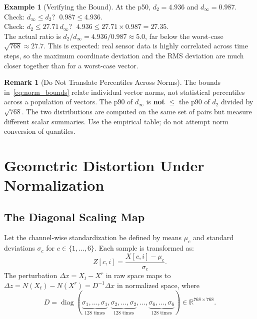 \documentclass[11pt, a4paper]{article}
\theoremstyle{definition}
\newtheorem{example}{Example}[section]
\newtheorem{remark}{Remark}[section]
\theoremstyle{plain}
\newcommand{\R}{\mathbb{R}}
\begin{document}
\begin{example}[Verifying the Bound]
  At the p50, $d_2 = 4.936$ and $d_\infty = 0.987$.
  Check: $d_\infty \le d_2$? $\;0.987 \le 4.936$. \checkmark \\
  Check: $d_2 \le 27.71 \, d_\infty$? $\;4.936 \le 27.71 \times 0.987 = 27.35$. \checkmark \\
  The actual ratio is $d_2 / d_\infty = 4.936 / 0.987 \approx 5.0$, far below
  the worst-case $\sqrt{768} \approx 27.7$. This is expected: real sensor data
  is highly correlated across time steps, so the maximum coordinate deviation
  and the RMS deviation are much closer together than for a worst-case vector.
\end{example}

\begin{remark}[Do Not Translate Percentiles Across Norms]
  The bounds in~\eqref{eq:norm_bounds} relate individual vector norms, not
  statistical percentiles across a population of vectors. The p90 of $d_\infty$
  is \textbf{not} $\le$ the p90 of $d_2$ divided by $\sqrt{768}$. The two
  distributions are computed on the same set of pairs but measure different
  scalar summaries. Use the empirical table; do not attempt norm conversion of
  quantiles.
\end{remark}

\section{Geometric Distortion Under Normalization}

\subsection{The Diagonal Scaling Map}

Let the channel-wise standardization be defined by means $\mu_c$ and standard
deviations $\sigma_c$ for $c \in \{1, \ldots, 6\}$. Each sample is transformed as:
\[
  Z[c, i] = \frac{X[c, i] - \mu_c}{\sigma_c}.
\]
The perturbation $\Delta x = X_t - X^r$ in raw space maps to
$\Delta z = N(X_t) - N(X^r) = D^{-1} \Delta x$ in normalized space, where
\[
  D = \operatorname{diag}(\underbrace{\sigma_1, \ldots, \sigma_1}_{128 \text{ times}},
                           \underbrace{\sigma_2, \ldots, \sigma_2}_{128 \text{ times}},
                           \ldots,
                           \underbrace{\sigma_6, \ldots, \sigma_6}_{128 \text{ times}})
  \in \R^{768 \times 768}.
\]
\end{document}
